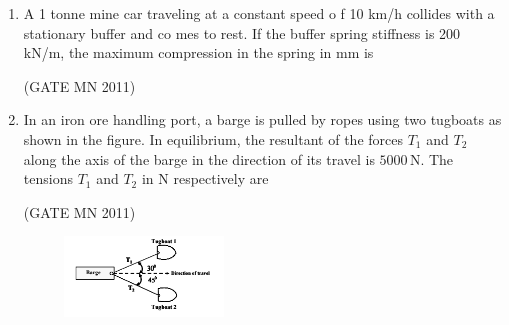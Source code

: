 \documentclass[journal]{IEEEtran}
\begin{document}
\begin{enumerate}
\item A 1 tonne mine car traveling at a constant speed o    f 10 km/h collides with a stationary buffer and co    mes to rest. If the buffer spring stiffness is 200     kN/m, the maximum compression in the spring in mm     is                        

	\hfill(GATE MN 2011)
\begin{enumerate}                                 
	\begin{multicols}{4}                     
	\item 49                                 
	\item 98                                 
	\item 196                                
	\item 247                                
	             \end{multicols}              
\end{enumerate}


\item In an iron ore handling port, a barge is pulled by ropes using two tugboats as shown in the figure. In equilibrium, the resultant of the forces $T_1$ and $T_2$ along the axis of the barge in the direction of its travel is $5000 \, \mathrm{N}$. The tensions $T_1$ and $T_2$ in N respectively are

	\hfill(GATE MN 2011)

\begin{figure}[H]
    \centering
\includegraphics[width=0.4\textwidth]{Screenshot_2025_0813_192351.png}
\caption{}
    \label{fig:Q31}
    \end{figure}

\begin{enumerate}
\end{enumerate}


\end{enumerate}
\end{document}
